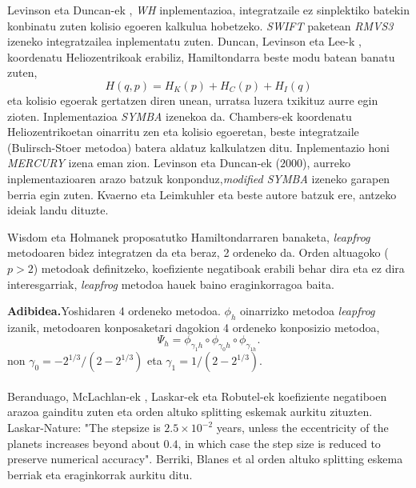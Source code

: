 Levinson eta Duncan-ek , \emph{WH} inplementazioa, integratzaile ez sinplektiko batekin konbinatu zuten kolisio egoeren kalkulua hobetzeko. \emph{SWIFT} paketean \emph{RMVS3} izeneko integratzailea inplementatu zuten. Duncan, Levinson eta Lee-k , koordenatu Heliozentrikoak erabiliz, Hamiltondarra beste modu batean banatu zuten,  
\begin{equation*}
H(q,p)=H_K(p)+H_C(p)+H_I(q)
\end{equation*}
eta kolisio egoerak gertatzen diren unean, urratsa luzera txikituz aurre egin zioten. Inplementazioa \emph{SYMBA} izenekoa da. Chambers-ek \cite{Chambers1999} koordenatu Heliozentrikoetan oinarritu zen eta kolisio egoeretan, beste integratzaile  (Bulirsch-Stoer metodoa) batera aldatuz kalkulatzen ditu. Inplementazio honi \emph{MERCURY} izena eman zion. Levinson eta Duncan-ek ($2000$), aurreko inplementazioaren arazo batzuk konponduz,\emph{modified SYMBA} izeneko garapen berria egin zuten.
Kvaerno eta Leimkuhler \cite{Kvaerno2000} eta beste autore batzuk ere, antzeko ideiak landu dituzte.

Wisdom eta Holmanek proposatutko Hamiltondarraren banaketa, \emph{leapfrog} metodoaren bidez integratzen da eta beraz, 2 ordeneko da. Orden altuagoko ($p>2$) metodoak definitzeko, koefiziente negatiboak erabili behar dira \cite{Yoshida1993} \cite{Laskar2001} eta ez dira interesgarriak, \emph{leapfrog} metodoa hauek baino eraginkorragoa baita. 

\textbf{Adibidea.}Yoshidaren 4 ordeneko metodoa. $\phi_h$ oinarrizko metodoa \emph{leapfrog} izanik, metodoaren konposaketari dagokion 4 ordeneko konposizio metodoa,
\begin{equation*}
\Psi_h=\phi_{\gamma_1 h} \circ \phi_{\gamma_0 h} \circ \phi_{\gamma_{1 h}}.
\end{equation*}  
non  $\gamma_0=-2^{1/3}/(2-2^{1/3})$ eta $\gamma_1=1/(2-2^{1/3})$.

\paragraph*{} Beranduago, McLachlan-ek , Laskar-ek eta Robutel-ek \cite[2001]{Laskar2001} koefiziente negatiboen arazoa gainditu zuten eta orden altuko splitting eskemak aurkitu zituzten. Laskar-Nature: "The stepsize is $2.5 \times 10^{-2}$ years, unless the eccentricity of the planets increases beyond about $0.4$, in which case the step size is reduced to preserve numerical accuracy". Berriki, Blanes et al  orden altuko splitting eskema berriak eta eraginkorrak aurkitu ditu. 

